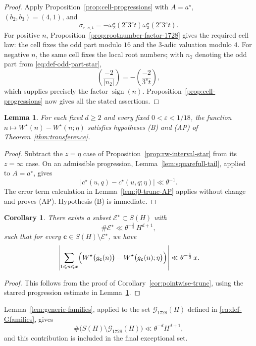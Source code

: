 \documentclass[12pt,reqno]{amsart}
\numberwithin{equation}{section}
\newtheorem{lemma}[theorem]{Lemma}
\newtheorem{corollary}[theorem]{Corollary}
\theoremstyle{definition}
\renewcommand{\le}{\leqslant}
\renewcommand{\ge}{\geqslant}
\newcommand{\cc}{\mathbf{c}}
\DeclareMathOperator{\sign}{sign}
\newcommand{\rw}{W}
\begin{document}
\begin{proof}
Apply Proposition~\ref{prop:cell-progressions} with $A=a^\star$, $(b_2,b_3)=(4,1)$, and
\[
\sigma_{r,s,t}
=-\omega_2^\star(2^r3^s t)\omega_3^\star(2^r3^s t).
\]
For positive $n$, Proposition~\ref{prop:rootnumber-factor-1728} gives the required cell law: the cell fixes the odd part modulo $16$ and the $3$-adic valuation modulo $4$.
For negative $n$, the same cell fixes the local root numbers; with $n_2$ denoting the odd part from \eqref{eq:def-odd-part-star},
\[
\left(\frac{-2}{|n_2|}\right)
=-\left(\frac{-2}{3^s t}\right),
\]
which supplies precisely the factor $\sign(n)$.
Proposition~\ref{prop:cell-progressions} now gives all the stated assertions.
\end{proof}

\begin{lemma}\label{lem:j1728-trunc-AP}
For each fixed $d\ge2$ and every fixed $0<\varepsilon<1/18$, the function $n\mapsto\rw^\star(n)-\rw^\star(n;\eta)$ satisfies hypotheses \textup{(B)} and \textup{(AP)} of Theorem~\ref{thm:transference}.
\end{lemma}

\begin{proof}
Subtract the $z=\eta$ case of Proposition~\ref{prop:rw-interval-star} from its $z=\infty$ case.
On an admissible progression, Lemma~\ref{lem:squarefull-tail}, applied to $A=a^\star$, gives
\[
|c^\star(u,q)-c^\star(u,q;\eta)|\ll\theta^{-1}.
\]
The error term calculation in Lemma~\ref{lem:j0-trunc-AP} applies without change and proves \textup{(AP)}.
Hypothesis \textup{(B)} is immediate.
\end{proof}

\begin{corollary}\label{cor:pointwise-trunc-star}
There exists a subset $\mathcal E^\star \subset S(H)$ with
\[
\#\mathcal E^\star \ll \theta^{-\frac{1}{3}}\,H^{d+1},
\]
such that for every $\cc\in S(H)\setminus\mathcal E^\star$, we have
\[
\left|
\sum_{1\le n\le x}
\Bigl(\rw^\star\bigl(g_{\cc}(n)\bigr)-\rw^\star\bigl(g_{\cc}(n); \eta\bigr)\Bigr)
\right|
\ll \theta^{-\frac{1}{3}}\,x.
\]
\end{corollary}
\begin{proof}
This follows from the proof of Corollary~\ref{cor:pointwise-trunc}, using the starred progression estimate in Lemma~\ref{lem:j1728-trunc-AP}.
\end{proof}

Lemma~\ref{lem:generic-families}, applied to the set $\mathcal G_{1728}(H)$ defined in \eqref{eq:def-Gfamilies}, gives
\[
\#\bigl(S(H)\setminus\mathcal G_{1728}(H)\bigr)
\ll\theta^{-d}H^{d+1},
\]
and this contribution is included in the final exceptional set.
\end{document}
